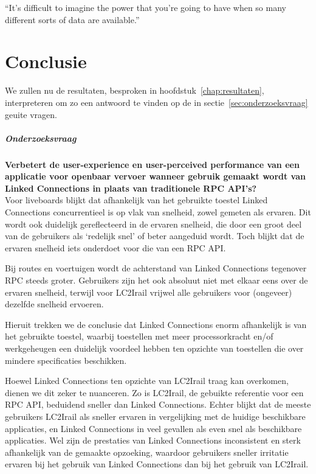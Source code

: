 \begin{savequote}[0.55\linewidth]
	``It’s difficult to imagine the power that you’re going to have when so many different sorts of data are available.''
\end{savequote}

\chapter{Conclusie}
\label{chap:interpretatie}

We zullen nu de resultaten, besproken in hoofdstuk~\ref{chap:resultaten}, interpreteren om zo een antwoord te vinden op de in sectie~\ref{sec:onderzoeksvraag} geuite vragen.

\paragraph{Onderzoeksvraag}  \textbf{Verbetert de user-experience en user-perceived performance van een applicatie voor openbaar vervoer wanneer gebruik gemaakt wordt van Linked Connections in plaats van traditionele RPC API's?}\\

Voor liveboards blijkt dat afhankelijk van het gebruikte toestel Linked Connections concurrentieel is op vlak van snelheid, zowel gemeten als ervaren. Dit wordt ook duidelijk gereflecteerd in de ervaren snelheid, die door een groot deel van de gebruikers als `redelijk snel' of beter aangeduid wordt. Toch blijkt dat de ervaren snelheid iets onderdoet voor die van een RPC API.

Bij routes en voertuigen wordt de achterstand van Linked Connections tegenover RPC steeds groter. Gebruikers zijn het ook absoluut niet met elkaar eens over de ervaren snelheid, terwijl voor LC2Irail vrijwel alle gebruikers voor (ongeveer) dezelfde snelheid ervoeren.

Hieruit trekken we de conclusie dat Linked Connections enorm afhankelijk is van het gebruikte toestel,  waarbij toestellen met meer processorkracht en/of werkgeheugen een duidelijk voordeel hebben ten opzichte van toestellen die over mindere specificaties beschikken.

Hoewel Linked Connections ten opzichte van LC2Irail traag kan overkomen, dienen we dit zeker te nuanceren. Zo is LC2Irail, de gebuikte referentie voor een RPC API, beduidend sneller dan Linked Connections. Echter blijkt dat de meeste gebruikers LC2Irail als sneller ervaren in vergelijking met de huidige beschikbare applicaties, en Linked Connections in veel gevallen als even snel als beschikbare applicaties. Wel zijn de prestaties van Linked Connections inconsistent en sterk afhankelijk van de gemaakte opzoeking, waardoor gebruikers sneller irritatie ervaren bij het gebruik van Linked Connections dan bij het gebruik van LC2Irail.


